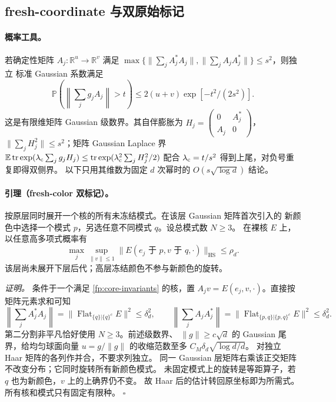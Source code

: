 \documentclass[a4paper]{tufte-handout}
\begin{document}
\begin{fullwidth}
\subsection{fresh-coordinate 与双原始标记}
\label{fp:core-fresh-section}

\paragraph{概率工具。}
若确定性矩阵 $A_j:\mathbb R^u\to\mathbb R^v$ 满足
$\max\{\|\sum_jA_j^*A_j\|,\|\sum_jA_jA_j^*\|\}\leq s^2$，则独立
标准 Gaussian 系数满足
\[
 \mathbb P\!\left(\left\|\sum_jg_jA_j\right\|>t\right)
 \leq2(u+v)\exp[-t^2/(2s^2)].
\]
这是有限维矩阵 Gaussian 级数界。其自伴膨胀为
$H_j=\left(\begin{smallmatrix}0&A_j^*\\ A_j&0\end{smallmatrix}\right)$，
$\|\sum_jH_j^2\|\leq s^2$；矩阵 Gaussian Laplace 界
$\mathbb E\operatorname{tr}\exp(\lambda_{\rm c}\sum_jg_jH_j)
\leq\operatorname{tr}\exp(\lambda_{\rm c}^2\sum_jH_j^2/2)$
配合 $\lambda_{\rm c}=t/s^2$ 得到上尾，对负号重复即得双侧界。
以下只用其维数为固定 $d$ 次幂时的 $O(s\sqrt{\log d})$ 结论。

\paragraph{引理（fresh-color 双标记）。}
\label{fp:core-fresh}
按原层同时展开一个核的所有未冻结模式。在该层 Gaussian 矩阵首次引入的
新颜色中选择一个模式 $p$，另选任意不同模式 $q$。设总模式数 $N\geq3$。
在裸核 $E$ 上，以任意高多项式概率有
\begin{equation}
 \max_j\sup_{\|v\|\leq1}
 \|E(e_j\text{ 于 }p,v\text{ 于 }q,\cdot)\|_{\mathrm{HS}}
 \leq\rho_d.
 \label{fp:core-fresh-slice}
\end{equation}
该层尚未展开下层后代；高层冻结颜色不参与新颜色的旋转。

\emph{证明。}
条件于一个满足 \eqref{fp:core-invariants} 的核，置
$A_jv=E(e_j,v,\cdot)$。直接按矩阵元素求和可知
\[
 \left\|\sum_jA_j^*A_j\right\|
 =\|\operatorname{Flat}_{\{q\}|\{q\}^c}E\|^2\leq\delta_d^2,
 \qquad
 \left\|\sum_jA_jA_j^*\right\|
 =\|\operatorname{Flat}_{\{p,q\}|\{p,q\}^c}E\|^2\leq\delta_d^2.
\]
第二分割非平凡恰好使用 $N\geq3$。前述级数界、
$\|g\|\geq c\sqrt d$ 的 Gaussian 尾界，给均匀球面向量 $u=g/\|g\|$
的收缩范数至多 $C_M\delta_d\sqrt{\log d/d}$。
对独立 Haar 矩阵的各列作并合，不要求列独立。
同一 Gaussian 层矩阵右乘该正交矩阵不改变分布；它同时旋转所有新颜色模式。
未固定模式上的旋转是等距算子，若 $q$ 也为新颜色，$v$ 上的上确界仍不变。
故 Haar 后的估计转回原坐标即为所需式。所有核和模式只有固定有限种。
\hfill$\square$


\end{fullwidth}
\end{document}
